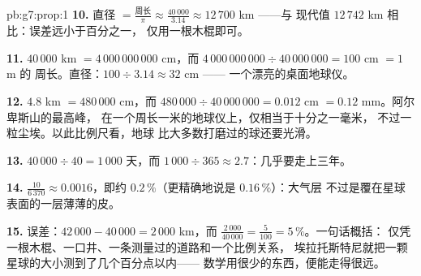 \begin{solution}{pb:g7:prop:1}
\textbf{10.} 直径 $= \frac{\text{周长}}{\pi}
\approx \frac{40\,000}{3.14} \approx 12\,700$ km ——与
现代值 $12\,742$ km 相比：误差远小于百分之一，
仅用一根木棍即可。

\textbf{11.} $40\,000$ km $= 4\,000\,000\,000$ cm，而
$4\,000\,000\,000 \div 40\,000\,000 = 100$ cm $= 1$ m 的
周长。直径：$100 \div 3.14 \approx 32$ cm ——
一个漂亮的桌面地球仪。

\textbf{12.} $4.8$ km $= 480\,000$ cm，而
$480\,000 \div 40\,000\,000 = 0.012$ cm $= 0.12$ mm。阿尔卑斯山的最高峰，
在一个周长一米的地球仪上，仅相当于十分之一毫米，
不过一粒尘埃。以此比例尺看，地球
比大多数打磨过的球还要光滑。

\textbf{13.} $40\,000 \div 40 = 1\,000$ 天，而
$1\,000 \div 365 \approx 2.7$：几乎要走上三年。

\textbf{14.} $\frac{10}{6\,370} \approx 0.0016$，即约
$0.2\,\%$（更精确地说是 $0.16\,\%$）：大气层
不过是覆在星球表面的一层薄薄的皮。

\textbf{15.} 误差：$42\,000 - 40\,000 = 2\,000$ km，而
$\frac{2\,000}{40\,000} = \frac{5}{100} = 5\,\%$。一句话概括：
仅凭一根木棍、一口井、一条测量过的道路和一个比例关系，
埃拉托斯特尼就把一颗星球的大小测到了几个百分点以内——
数学用很少的东西，便能走得很远。
\end{solution}
